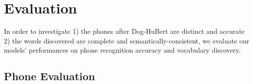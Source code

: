 





\section{Evaluation}
In order to investigate  1) the phones after Dog-HuBert are distinct and accurate 2) the words discovered are complete and semantically-consistent, we evaluate our models' performances on phone recognition accuracy and vocabulary  discovery. 
\subsection{Phone Evaluation}

